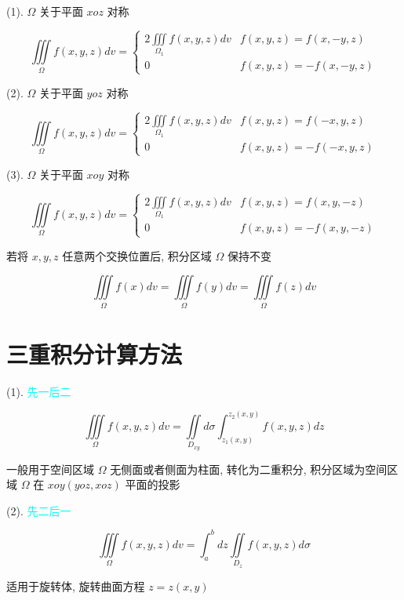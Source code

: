 \begin{definition}[普通对称性]
	(1). $\Omega$ 关于平面 $xoz$ 对称

	$$\iiint\limits_{\Omega}f(x,y,z)dv = 
	\begin{cases}
		2\iiint\limits_{\Omega_{1}}f(x,y,z)dv & f(x,y,z) = f(x,-y,z)\\
		0                                     & f(x,y,z) = -f(x,-y,z)
	\end{cases}$$

	(2). $\Omega$ 关于平面 $yoz$ 对称

	$$\iiint\limits_{\Omega}f(x,y,z)dv =
	\begin{cases}
		2\iiint\limits_{\Omega_{1}}f(x,y,z)dv & f(x,y,z) = f(-x,y,z)\\
		0                                     & f(x,y,z) = -f(-x,y,z)
	\end{cases}$$

	(3). $\Omega$ 关于平面 $xoy$ 对称

	$$\iiint\limits_{\Omega}f(x,y,z)dv =
	\begin{cases}
		2\iiint\limits_{\Omega_{1}}f(x,y,z)dv & f(x,y,z) = f(x,y,-z)\\
		0                                     & f(x,y,z) = -f(x,y,-z)
	\end{cases}$$

\end{definition}

\begin{definition}[轮换对称性]
	若将 $x,y,z$ 任意两个交换位置后, 积分区域 $\Omega$ 保持不变

	$$\iiint\limits_{\Omega}f(x)dv=\iiint\limits_{\Omega}f(y)dv=\iiint\limits_{\Omega}f(z)dv$$
\end{definition}

\section{三重积分计算方法}


\begin{definition}[直角坐标系]
	(1). \textcolor{cyan}{先一后二}

	$$\iiint\limits_{\Omega}f(x,y,z)dv=\iint\limits_{D_{xy}}d\sigma \int_{z_{1}(x,y)}^{z_{2}(x,y)}f(x,y,z)dz$$
	
	一般用于空间区域 $\Omega$ 无侧面或者侧面为柱面, 转化为二重积分, 积分区域为空间区域 $\Omega$ 在 $xoy(yoz,xoz)$ 平面的投影
	
	(2). \textcolor{cyan}{先二后一}

	$$\iiint\limits_{\Omega}f(x,y,z)dv = \int_{a}^{b}dz\iint\limits_{D_{z}}f(x,y,z)d\sigma$$
	
	适用于旋转体, 旋转曲面方程 $z = z(x,y)$
\end{definition}

